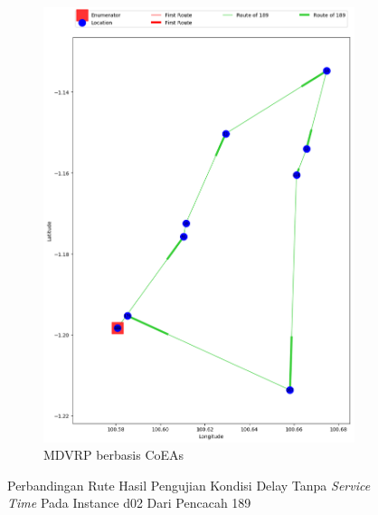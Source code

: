 \begin{figure}[H]
	\centering
	\begin{subfigure}[t]{\textwidth}
		\centering
		\includegraphics[width=\textwidth]{Resources/Images/delayed_2/real_m15_n100_delayed_2_189_coes}
		\caption{MDVRP berbasis CoEAs}
		\label{fig:real_m15_n100_delayed_2_189_coes}
	\end{subfigure}
	\caption{Perbandingan Rute Hasil Pengujian Kondisi Delay Tanpa \textit{Service Time} Pada Instance d02 Dari Pencacah 189}
	\label{fig:real_m15_n100_delayed_2_189}
\end{figure}


